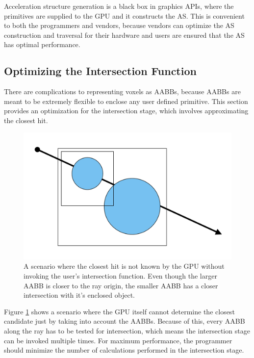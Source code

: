 \documentclass[12pt]{article}
\begin{document}
Acceleration structure generation is a black box in graphics APIs, where
the primitives are supplied to the GPU and it constructs the AS. This is convenient to both the programmers and vendors, because
vendors can optimize the AS construction and traversal for their hardware and users are ensured that the AS has optimal performance.

\subsection{Optimizing the Intersection Function}
\label{sec:OptimizingIntersection}

There are complications to representing voxels as AABBs, because AABBs are meant to be extremely flexible to
enclose any user defined primitive. This section provides an optimization for the intersection stage,
which involves approximating the closest hit.

\begin{figure}[H]
    \begin{center}
        \includegraphics[scale=0.5]{ClosestHit-Ambigous}
    \end{center}
    \caption{
        A scenario where the closest hit is not known by the GPU without invoking the user's intersection function.
        Even though the larger AABB is closer to the ray origin, the smaller AABB has a closer intersection
        with it's enclosed object.
    }
    \label{fig:ClosestHit-Ambigous}
\end{figure}

Figure \ref{fig:ClosestHit-Ambigous} shows a scenario where the GPU itself cannot determine the closest candidate just by
taking into account the AABBs. Because of this, every AABB along the ray has to be tested for intersection, which
means the intersection stage can be invoked multiple times. For maximum performance, the programmer should minimize
the number of calculations performed in the intersection stage.
\end{document}

